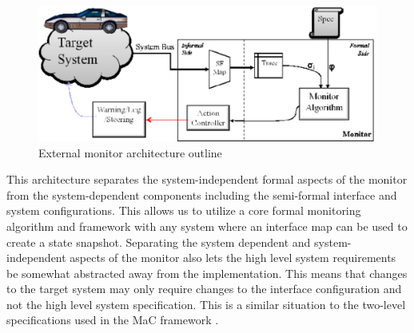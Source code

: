 
\begin{figure}
\includegraphics[width=4.5in]{img/mon_arch}
\caption{External monitor architecture outline \label{fig:architecture}}
\end{figure}

This architecture separates the system-independent formal aspects of the monitor from the system-dependent components including the semi-formal interface and system configurations. 
This allows us to utilize a core formal monitoring algorithm and framework with any system where an interface map can be used to create a state snapshot. 
Separating the system dependent and system-independent aspects of the monitor also lets the high level system requirements be somewhat abstracted away from the implementation. This means that changes to the target system may only require changes to the interface configuration and not the high level system specification. This is a similar situation to the two-level specifications used in the MaC framework \cite{Kim2004}.

